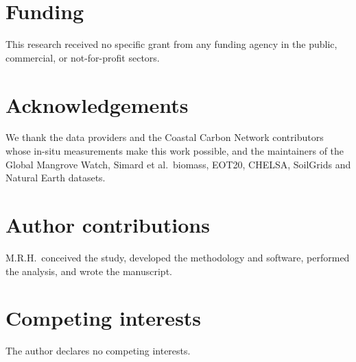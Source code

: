 \documentclass[twocolumn,9pt]{extarticle}
\begin{document}
\section*{Funding}
This research received no specific grant from any funding agency in the public,
commercial, or not-for-profit sectors.

\section*{Acknowledgements}
We thank the data providers and the Coastal Carbon Network contributors whose in-situ
measurements make this work possible, and the maintainers of the Global Mangrove Watch,
Simard et al.\ biomass, EOT20, CHELSA, SoilGrids and Natural Earth datasets.

\section*{Author contributions}
M.R.H.\ conceived the study, developed the methodology and software, performed the
analysis, and wrote the manuscript.

\section*{Competing interests}
The author declares no competing interests.
\end{document}
